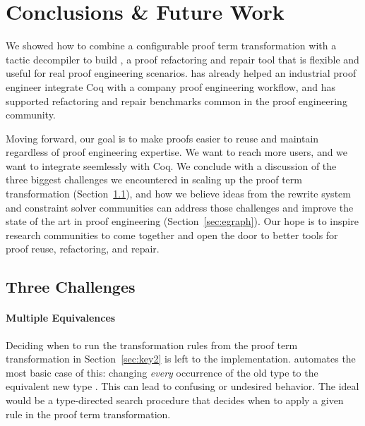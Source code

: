 \section{Conclusions \& Future Work}
\label{sec:discussion}

We showed how to combine a configurable proof term transformation with a tactic decompiler to build \toolname,
a proof refactoring and repair tool that is flexible and useful for real proof engineering scenarios.
\toolname has already helped an industrial proof engineer integrate Coq with a company proof engineering workflow,
and has supported refactoring and repair benchmarks common in the proof engineering community.

Moving forward, our goal is to make proofs easier to reuse and maintain regardless of proof engineering expertise.
We want to reach more users, and we want \toolname to integrate seemlessly with Coq.
We conclude with a discussion of the three biggest challenges we encountered in scaling up the \toolname proof term 
transformation (Section~\ref{sec:problems}), and how we believe ideas from the rewrite system and constraint
solver communities can address those challenges and improve the state of the art in proof engineering (Section~\ref{sec:egraph}).
Our hope is to inspire research communities to come together and open the door to better tools for proof reuse, refactoring, and repair.

\subsection{Three Challenges}
\label{sec:problems}

\paragraph{Multiple Equivalences}

Deciding when to run the transformation rules from the proof term transformation in Section~\ref{sec:key2} is left to the implementation.
\toolname automates the most basic case of this: changing \textit{every} occurrence of the old type \A to the equivalent new type \B.
This can lead to confusing or undesired behavior.
The ideal would be a type-directed search procedure that decides when to apply a given rule in the proof term transformation.

